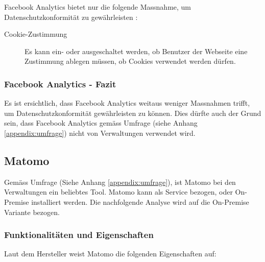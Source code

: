 Facebook Analytics bietet nur die folgende Massnahme, um Datenschutzkonformität zu gewährleisten \parencite{facebookAnalyticsGDPR}: 

\begin{description}
  \item[Cookie-Zustimmung] Es kann ein- oder ausgeschaltet werden, ob Benutzer der Webseite eine Zustimmung ablegen müssen, ob Cookies verwendet werden dürfen.
\end{description}

\subsubsection{Facebook Analytics - Fazit}
Es ist ersichtlich, dass Facebook Analytics weitaus weniger Massnahmen trifft, um Datenschutzkonformität gewährleisten zu können. Dies dürfte auch der Grund sein, dass Facebook Analytics gemäss Umfrage (siehe Anhang \ref{appendix:umfrage}) nicht von Verwaltungen verwendet wird.

\newpage

\subsection{Matomo} \label{subsec:matomomarkt}

Gemäss Umfrage (Siehe Anhang \ref{appendix:umfrage}), ist Matomo bei den Verwaltungen ein beliebtes Tool. Matomo kann als Service bezogen, oder On-Premise installiert werden. Die nachfolgende Analyse wird auf die On-Premise Variante bezogen.

\subsubsection{Funktionalitäten und Eigenschaften}
Laut dem Hersteller weist Matomo die folgenden Eigenschaften auf:

